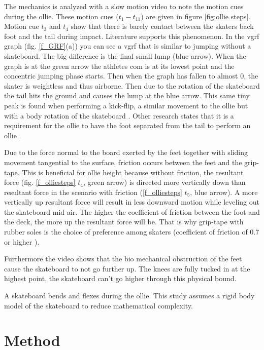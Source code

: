 \documentclass[default,iicol]{sn-jnl}
\begin{document}
The mechanics is analyzed with a slow motion video to note the motion cues
during the ollie. These motion cues ($t_1-t_{11}$) are given in figure
\ref{fig:ollie steps}. Motion cue $t_3$ and $t_4$ show that there is barely
contact between the skaters back foot and the tail during impact. Literature
supports this phenomenon. In the \gls{vgrf} graph
(fig. \ref{f_GRF}(a)) you can see a \gls{vgrf} that is similar to jumping without a
skateboard. The big difference is the final small lump (blue arrow). When the
graph is at the green arrow the athletes \gls{com} is at its lowest
point and the concentric jumping phase starts. Then when the graph has fallen
to almost 0, the skater is weightless and thus airborne. Then due to the
rotation of the skateboard the tail hits the ground and causes the lump at the
blue arrow. This same tiny peak is found when performing a kick-flip, a similar
movement to the ollie but with a body rotation of the skateboard
\cite{determan_kinetics_2006}. Other research states that it is a requirement
for the ollie to have the foot separated from the tail to perform an ollie
\cite{nakashima_simulation_2021}.

Due to the force normal to the board exerted by the feet together with sliding
movement tangential to the surface, friction occurs between the feet and the
grip-tape. This is beneficial for ollie height because without friction, the
resultant force (fig. \ref{f_olliesteps} $t_4$, green arrow) is directed more
vertically down than resultant force in the scenario with friction
(\ref{f_olliesteps} $t_5$, blue arrow). A more vertically up resultant force
will result in less downward motion while leveling out the skateboard mid air.
The higher the coefficient of friction between the foot and the deck, the more
up the resultant force will be. That is why grip-tape with rubber soles is the
choice of preference among skaters (coefficient of friction of 0.7 or higher
\cite{bron_nog_nodate}).

Furthermore the video shows that the bio mechanical obstruction of the feet
cause the skateboard to not go further up. The knees are fully tucked in at the
highest point, the skateboard can't go higher through this physical bound.

A skateboard bends and flexes during the ollie. This study assumes a rigid body
model of the skateboard to reduce mathematical complexity.

\section{Method}
\end{document}
